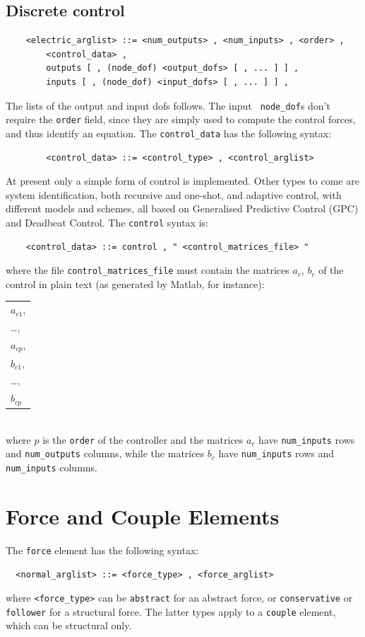 \subsection{Discrete control}
  \begin{verbatim}
    <electric_arglist> ::= <num_outputs> , <num_inputs> , <order> ,
        <control_data> , 
        outputs [ , (node_dof) <output_dofs> [ , ... ] ] ,
        inputs [ , (node_dof) <input_dofs> [ , ... ] ] ,
  \end{verbatim}
  The lists of the output and input dofs follows. The input {\tt
  node\_dof}s don't require the \texttt{order} field, since they are simply
  used to compute the control forces, and thus identify an equation.
  The \texttt{control\_data} has the following syntax:
  \begin{verbatim}  
        <control_data> ::= <control_type> , <control_arglist>
  \end{verbatim}
  At present only a simple form of control is implemented. Other types
  to come are system identification, both recursive and one-shot, and
  adaptive control, with different models and schemes, all based on 
  Generalised Predictive Control (GPC) and Deadbeat Control.
  The \texttt{control} syntax is:
  \begin{verbatim}
    <control_data> ::= control , " <control_matrices_file> "
  \end{verbatim}
  where the file \texttt{control\_matrices\_file} must contain the matrices
  $ a_c $, $ b_c $ of the control in plain text (as generated by Matlab, for
  instance): \\
  \begin{tabular}{l}
    $ a_{c1} $, \\
    \ldots,     \\
    $ a_{cp} $, \\
    $ b_{c1} $, \\
    \ldots,     \\
    $ b_{cp} $  \\
  \end{tabular} \\
  where $ p $ is the \texttt{order} of the controller and the matrices $ a_c $
  have \texttt{num\_inputs} rows and \texttt{num\_outputs} columns, while the
  matrices $ b_c $ have \texttt{num\_inputs} rows and \texttt{num\_inputs} columns.





\section{Force and Couple Elements}
The \texttt{force} element has the following syntax:
\begin{verbatim}
  <normal_arglist> ::= <force_type> , <force_arglist>
\end{verbatim}
where \texttt{<force\_type>} can be \texttt{abstract} for an abstract force, or 
\texttt{conservative} or \texttt{follower} for a structural force. The latter types
apply to a \texttt{couple} element, which can be structural only.

